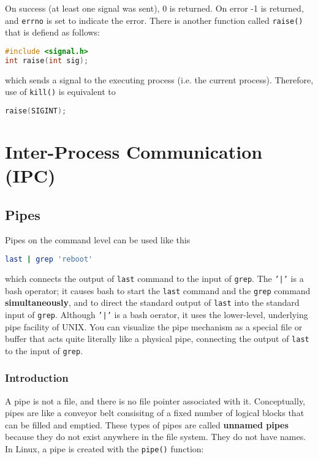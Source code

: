 \documentclass{article}
\newcommand{\bold}[1]{\textbf{#1}}
\newcommand{\code}[1]{\texttt{#1}}
\begin{document}
\noindent On success (at least one signal was sent), 0 is returned. On error -1 is returned, and \code{errno} is set to indicate the error. There is another function called \code{raise()} that is defiend as follows:

\begin{lstlisting}[language=C]
#include <signal.h>
int raise(int sig);
\end{lstlisting}

\noindent which sends a signal to the executing process (i.e. the current process). Therefore, use of \code{kill()} is equivalent to 

\begin{lstlisting}[language=C]
raise(SIGINT);
\end{lstlisting}

\newpage
\section{Inter-Process Communication (IPC)}

\subsection{Pipes}

Pipes on the command level can be used like this

\begin{lstlisting}[language=bash]
last | grep 'reboot'
\end{lstlisting}

\noindent which connects the output of \code{last} command to the input of \code{grep}. The \code{'|'} is a bash operator; it causes bash to start the \code{last} command and the \code{grep} command \bold{simultaneously}, and to direct the standard output of \code{last} into the standard input of \code{grep}. Although \code{'|'} is a bash oerator, it uses the lower-level, underlying pipe facility of UNIX. You can visualize the pipe mechanism as a special file or buffer that acts quite literally like a physical pipe, connecting the output of \code{last} to the input of \code{grep}. 

\subsubsection{Introduction}

A pipe is not a file, and there is no file pointer associated with it. Conceptually, pipes are like a conveyor belt consisitng of a fixed number of logical blocks that can be filled and emptied. These types of pipes are called \bold{unnamed pipes} because they do not exist anywhere in the file system. They do not have names. In Linux, a pipe is created with the \code{pipe()} function: 
\end{document}
